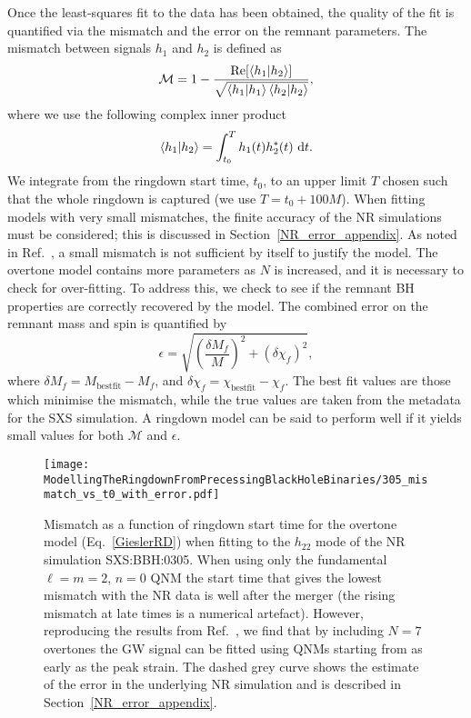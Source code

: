 Once the least-squares fit to the data has been obtained, the quality of the fit is quantified via the mismatch and the error on the remnant parameters.
The mismatch between signals $h_1$ and $h_2$ is defined as
\begin{equation}\label{mismatch}
    \mathcal{M} = 1 - \frac{\Re[\braket{h_1}{h_2}]}{\sqrt{\braket{h_1}\braket{h_2}}},
\end{equation}
where we use the following complex inner product~\cite{Nollert:1998ys}
\begin{equation} \label{eq:inner_prod}
    \braket{h_1}{h_2} = \int_{t_0}^T h_1(t) h^*_2(t) ~ \dd t.
\end{equation}
We integrate from the ringdown start time, $t_0$, to an upper limit $T$ chosen such that the whole ringdown is captured (we use $T = t_0 + 100M$).
When fitting models with very small mismatches, the finite accuracy of the NR simulations must be considered; this is discussed in Section~\ref{NR_error_appendix}.
As noted in Ref.~\cite{Giesler:2019uxc}, a small mismatch is not sufficient by itself to justify the model.
The overtone model contains more parameters as $N$ is increased, and it is necessary to check for over-fitting.
To address this, we check to see if the remnant BH properties are correctly recovered by the model. 
The combined error on the remnant mass and spin is quantified by \cite{Giesler:2019uxc}
\begin{equation} \label{eq:epsilon}
    \epsilon = \sqrt{ \left( \frac{\delta M_f}{M} \right)^2 + \left( \delta\chi_f \right)^2 },
\end{equation}
where $\delta M_f = M_{\mathrm{best fit}} - M_f$, and $\delta \chi_f = \chi_{\mathrm{best fit}} - \chi_f$. 
The best fit values are those which minimise the mismatch, while the true values are taken from the metadata for the SXS simulation.
A ringdown model can be said to perform well if it yields small values for both $\mathcal{M}$ and $\epsilon$.

\begin{figure}[t]
    \centering
    \texttt{[image: ModellingTheRingdownFromPrecessingBlackHoleBinaries/305\_mismatch\_vs\_t0\_with\_error.pdf]}
    \caption[Mismatch as a function of ringdown start time for an overtone model fitted to SXS:BBH:0305]{ 
    Mismatch as a function of ringdown start time for the overtone model (Eq.~\ref{GieslerRD}) when fitting to the $h_{22}$ mode of the NR simulation SXS:BBH:0305. 
    When using only the fundamental $\ell = m = 2$, $n = 0$ QNM the start time that gives the lowest mismatch with the NR data is well after the merger (the rising mismatch at late times is a numerical artefact). 
    However, reproducing the results from Ref.~\cite{Giesler:2019uxc}, we find that by including $N=7$ overtones the GW signal can be fitted using QNMs starting from as early as the peak strain. 
    The dashed grey curve shows the estimate of the error in the underlying NR simulation and is described in Section~\ref{NR_error_appendix}.
    }
    \label{305_mismatch_vs_t0}
\end{figure}

